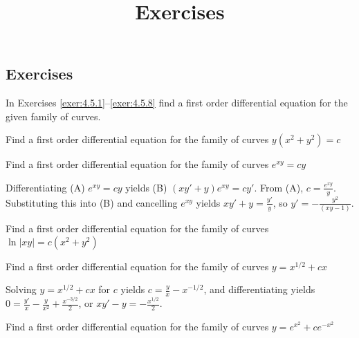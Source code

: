 \documentclass{ximera}
\title{Exercises} \license{CC BY-NC-SA 4.0}
\begin{document}
\begin{abstract}
\end{abstract}
\maketitle

\begin{onlineOnly}
\section*{Exercises}
\end{onlineOnly}


In  Exercises \ref{exer:4.5.1}--\ref{exer:4.5.8} find a first order
differential equation for the given family of curves.

\begin{problem}\label{exer:4.5.1} 
Find a first order
differential equation for the family of curves $y(x^2+y^2)=c$
\end{problem}

\begin{problem}\label{exer:4.5.2} Find a first order
differential equation for the family of curves  $e^{xy}=cy$

\begin{solution}
Differentiating (A) $e^{xy}=cy$ yields (B) $(xy'+y)e^{xy}=cy'$. From
(A), $c=\frac{e^{xy}}{y}$. Substituting this into (B) and
cancelling $e^{xy}$ yields $xy'+y=\frac{y'}{y}$, so
$y'=-\frac{y^2}{(xy-1)}$.
\end{solution}
\end{problem}

 \begin{problem}\label{exer:4.5.3} Find a first order
differential equation for the family of curves  $\ln |xy|=c(x^2+y^2)$
\end{problem}

 \begin{problem}\label{exer:4.5.4} Find a first order
differential equation for the family of curves 
 $y=x^{1/2}+cx$

\begin{solution}
Solving $y=x^{1/2}+cx$ for $c$ yields $c=\frac{y}{x}-x^{-1/2}$, and
differentiating yields $0=\frac{y'}{x}-\frac{y}{x^2}+\frac{x^{-3/2}}{2}$, or $xy'-y=-\frac{x^{1/2}}{2}$.
\end{solution}
\end{problem}

\begin{problem}\label{exer:4.5.5} Find a first order
differential equation for the family of curves 
 $y=e^{x^2}+ce^{-x^2}$
 \end{problem}
 
\end{document}
